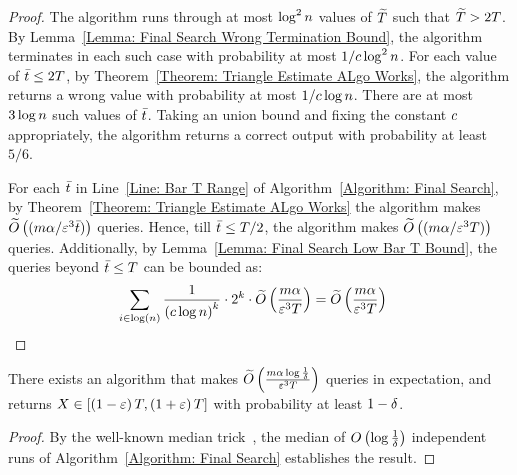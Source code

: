 \begin{proof}
    The algorithm runs through at most $\log^2 n$ values of $\widetilde{T}$ such that $\widetilde{T} > 2T$. By Lemma~\ref{Lemma: Final Search Wrong Termination Bound}, the algorithm terminates in each such case with probability at most $1/c\log^2n$. For each value of $\bar{t}  \leq 2T$, by Theorem~\ref{Theorem: Triangle Estimate ALgo Works}, the algorithm returns a wrong value with probability at most $1/c\log n$. There are at most $3\log n$ such values of $\bar{t}$. Taking an union bound and fixing the constant $c$ appropriately, the algorithm returns a correct output with probability at least $5/6$.

    For each  $\bar{t} $ in Line~\ref{Line: Bar T Range} of Algorithm~\ref{Algorithm: Final Search}, by Theorem~\ref{Theorem: Triangle Estimate ALgo Works} the algorithm makes $\widetilde{O}\left({{(m\alpha/\varepsilon^3\bar{t} )}}\right)$ queries. Hence, till $\bar{t}  \leq T/2$, the algorithm makes $\widetilde{O}\left({{(m\alpha/\varepsilon^3T)}}\right)$ queries. Additionally, by Lemma~\ref{Lemma: Final Search Low Bar T Bound}, the queries beyond $\bar{t}  \leq T$ can be bounded as:
    \begin{align*}
        \sum_{i \in \log\left({n}\right)}\frac{1}{\left({c\log n}\right)^k}\cdot2^k \cdot\widetilde{O}\left({{\frac{m\alpha}{\varepsilon^3T}}}\right) &=\widetilde{O}\left({{\frac{m\alpha}{\varepsilon^3T}}}\right)
    \end{align*}
\end{proof}

\begin{theorem}
    There exists an algorithm that makes $\widetilde{O}\left({{\frac{m\alpha\log\frac{1}{\delta}}{\varepsilon^3T}}}\right)$ queries in expectation, and returns $X \in \left[{\left({1-\varepsilon}\right)T,\left({1+\varepsilon}\right)T}\right]$ with probability at least $1 - \delta$.
\end{theorem}

\begin{proof}
    By the well-known median trick~\citep{chakrabarti2015data}, the median of $O\left({{\log\frac{1}{\delta}}}\right)$ independent runs of Algorithm~\ref{Algorithm: Final Search} establishes the result.
\end{proof}











